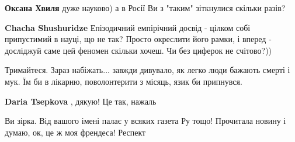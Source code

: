 \begin{itemize}
\begin{itemize}
 
\textbf{Оксана Хвиля} дуже науково) а в Росії Ви з "таким" зіткнулися скільки разів?

 
\textbf{Chacha Shushuridze} Епізодичний емпірічний досвід - цілком собі
припустимий в науці, що не так? Просто окреслити його рамки, і вперед -
досліджуй саме цей феномен скільки хочеш. Чи без циферок не счітово?))

\end{itemize}

 

Тримайтеся. Зараз набіжать... завжди дивувало, як легко люди бажають смерті і
мук. Їм би в лікарню, поволонтерити з місяць, язик би припнувся.

\begin{itemize}
 
\textbf{Daria Tsepkova} , дякую! Це так, нажаль
\end{itemize}

 
Ви зірка. Від вашого імені палає у всяких газета Ру тощо! Прочитала новину і думаю, ок, це ж моя френдеса! Респект

\begin{itemize}
 

\end{itemize}
\end{itemize}
